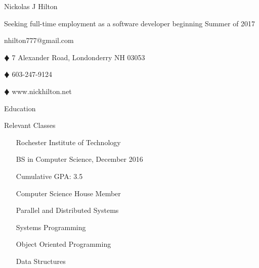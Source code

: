 \documentclass{article}
\newcommand{\lineseparator}[1]{\noindent\makebox[\linewidth]{\rule{\textwidth}{#1}}}
\begin{document}
\begin{minipage}[t]{0.4\textwidth}
  \hspace{-6.5mm}
  {\Huge Nickolas J Hilton }
\end{minipage}
\hspace{-6.5mm}
\begin{minipage}[b]{0.6\textwidth}
  \begin{flushright}
    {\small Seeking full-time employment as a software developer beginning Summer of 2017 }
  \end{flushright}
\end{minipage}
\vspace{1mm}
\lineseparator{1.5pt}
\vspace{-2mm}
\begin{center}
  nhilton777@gmail.com 
  \begin{inparaitem}
  \item[$\vardiamond$] 7 Alexander Road, Londonderry NH 03053     
  \item[$\vardiamond$] 603-247-9124 
  \item[$\vardiamond$] www.nickhilton.net 
  \end{inparaitem}
\end{center}
\begin{minipage}[t]{0.5\textwidth}
  {\Large Education } 
\end{minipage}
\begin{minipage}[t]{0.5\textwidth}
  {\Large Relevant Classes } 
\end{minipage}
\lineseparator{0.5pt}
\vspace{4mm}
\begin{minipage}[t]{0.5\textwidth}
  \vspace{0.5mm}
  \begin{itemize}[leftmargin=4mm]
    \item[] Rochester Institute of Technology  \vspace{-2mm}  
    \item[] BS in Computer Science, December 2016 \vspace{-2mm}  
    \item[] Cumulative GPA: 3.5 \vspace{-2mm}  
    \item[] Computer Science House Member  
  \end{itemize}
\end{minipage}
\begin{minipage}[t]{0.5\textwidth}
  \vspace{0.5mm}
  \begin{itemize}[leftmargin=4mm]
    \item[] Parallel and Distributed Systems \vspace{-2mm}  
    \item[] Systems Programming \vspace{-2mm}  
    \item[] Object Oriented Programming \vspace{-2mm}  
    \item[] Data Structures 
  \end{itemize}
\end{minipage}
\end{document}

